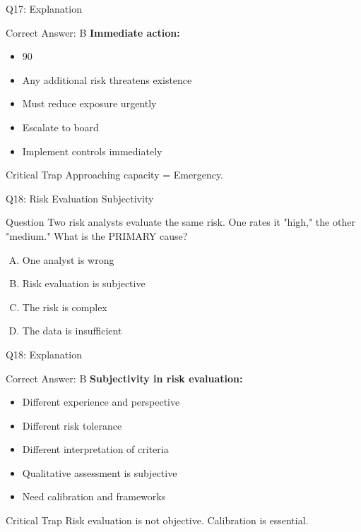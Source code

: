 \documentclass{beamer}
\begin{document}
			\begin{frame}{Q17: Explanation}
				\begin{block}{Correct Answer: B}
					\textbf{Immediate action:}
					\begin{itemize}
						\item 90%
						\item Any additional risk threatens existence
						\item Must reduce exposure urgently
						\item Escalate to board
						\item Implement controls immediately
					\end{itemize}
				\end{block}
				\begin{alertblock}{Critical Trap}
					Approaching capacity = Emergency.
				\end{alertblock}
			\end{frame}
			
			\begin{frame}{Q18: Risk Evaluation Subjectivity}
				\begin{block}{Question}
					Two risk analysts evaluate the same risk. One rates it "high," the other "medium." What is the PRIMARY cause?
				\end{block}
				\begin{enumerate}[(A)]
					\item One analyst is wrong
					\item Risk evaluation is subjective
					\item The risk is complex
					\item The data is insufficient
				\end{enumerate}
			\end{frame}
			
			\begin{frame}{Q18: Explanation}
				\begin{block}{Correct Answer: B}
					\textbf{Subjectivity in risk evaluation:}
					\begin{itemize}
						\item Different experience and perspective
						\item Different risk tolerance
						\item Different interpretation of criteria
						\item Qualitative assessment is subjective
						\item Need calibration and frameworks
					\end{itemize}
				\end{block}
				\begin{alertblock}{Critical Trap}
					Risk evaluation is not objective. Calibration is essential.
				\end{alertblock}
			\end{frame}
			
\end{document}
